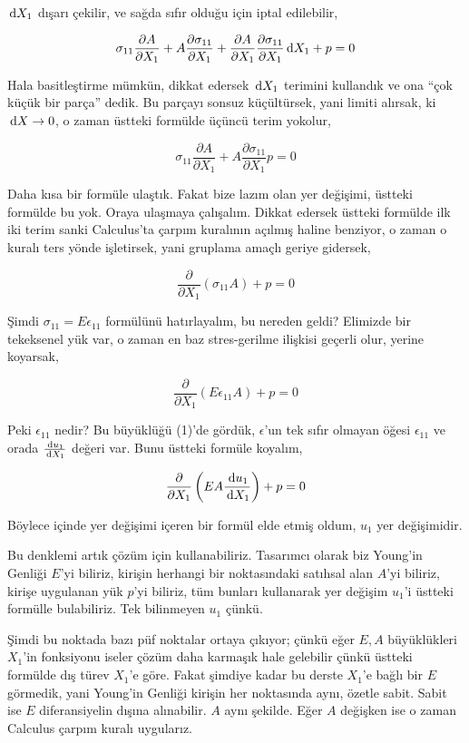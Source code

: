 \documentclass[12pt,fleqn]{article}\usepackage{../../common}
\begin{document}
$\,\mathrm{d} X_1$ dışarı çekilir, ve sağda sıfır olduğu için iptal edilebilir,

$$
\sigma_{11} \frac{\partial A}{\partial X_1}  +
A \frac{\partial \sigma_{11}}{\partial X_1}  +
\frac{\partial A}{\partial X_1} \frac{\partial \sigma_{11}}{\partial X_1} \,\mathrm{d} X_1 +
p  = 0
$$

Hala basitleştirme mümkün, dikkat edersek $\,\mathrm{d} X_1$ terimini kullandık ve
ona ``çok küçük bir parça'' dedik. Bu parçayı sonsuz küçültürsek, yani
limiti alırsak, ki $\,\mathrm{d} X \to 0$, o zaman üstteki formülde üçüncü terim
yokolur,

$$
\sigma_{11} \frac{\partial A}{\partial X_1}  +
A \frac{\partial \sigma_{11}}{\partial X_1}  
p  = 0
$$

Daha kısa bir formüle ulaştık. Fakat bize lazım olan yer değişimi, üstteki
formülde bu yok. Oraya ulaşmaya çalışalım. Dikkat edersek üstteki formülde
ilk iki terim sanki Calculus'ta çarpım kuralının açılmış haline benziyor,
o zaman o kuralı ters yönde işletirsek, yani gruplama amaçlı geriye gidersek,

$$
\frac{\partial }{\partial X_1} (\sigma_{11} A ) + p = 0
$$

Şimdi $\sigma_{11} = E \epsilon_{11}$ formülünü hatırlayalım, bu nereden geldi?
Elimizde bir tekeksenel yük var, o zaman en baz stres-gerilme ilişkisi geçerli
olur, yerine koyarsak,

$$
\frac{\partial }{\partial X_1} (E \epsilon_{11} A ) + p = 0
$$

Peki $\epsilon_{11}$ nedir? Bu büyüklüğü (1)'de gördük, $\epsilon$'un tek sıfır
olmayan öğesi $\epsilon_{11}$ ve orada $\frac{\,\mathrm{d} u_1}{\,\mathrm{d} X_1}$ değeri
var. Bunu üstteki formüle koyalım,

$$
\frac{\partial }{\partial X_1} \left( E A \frac{\,\mathrm{d} u_1}{\,\mathrm{d} X_1} \right) + p = 0
$$

Böylece içinde yer değişimi içeren bir formül elde etmiş oldum, $u_1$ yer
değişimidir.

Bu denklemi artık çözüm için kullanabiliriz. Tasarımcı olarak biz Young'in
Genliği $E$'yi biliriz, kirişin herhangi bir noktasındaki satıhsal alan $A$'yi
biliriz, kirişe uygulanan yük $p$'yi biliriz, tüm bunları kullanarak yer değişim
$u_1$'i üstteki formülle bulabiliriz. Tek bilinmeyen $u_1$ çünkü.

Şimdi bu noktada bazı püf noktalar ortaya çıkıyor; çünkü eğer $E,A$ büyüklükleri
$X_1$'in fonksiyonu iseler çözüm daha karmaşık hale gelebilir çünkü üstteki
formülde dış türev $X_1$'e göre. Fakat şimdiye kadar bu derste $X_1$'e bağlı bir
$E$ görmedik, yani Young'in Genliği kirişin her noktasında aynı, özetle sabit.
Sabit ise $E$ diferansiyelin dışına alınabilir. $A$ aynı şekilde. Eğer $A$
değişken ise o zaman Calculus çarpım kuralı uygularız.
\end{document}
